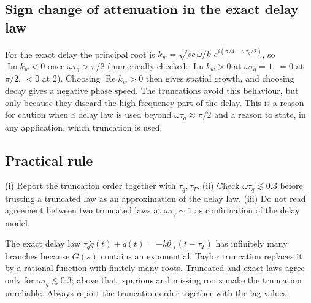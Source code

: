 \subsection{Sign change of attenuation in the exact delay law}
For the exact delay the principal root is $k_w=\sqrt{\rho c\,\omega/k}\;e^{i(\pi/4-\omega\tau_q/2)}$, so $\operatorname{Im}k_w<0$ once $\omega\tau_q>\pi/2$ (numerically checked: $\operatorname{Im}k_w>0$ at $\omega\tau_q=1$, $=0$ at $\pi/2$, $<0$ at $2$). Choosing $\operatorname{Re}k_w>0$ then gives spatial growth, and choosing decay gives a negative phase speed. The truncations avoid this behaviour, but only because they discard the high-frequency part of the delay. This is a reason for caution when a delay law is used beyond $\omega\tau_q\approx\pi/2$ and a reason to state, in any application, which truncation is used.

\subsection{Practical rule}
(i) Report the truncation order together with $\tau_q,\tau_T$. (ii) Check $\omega\tau_q\lesssim0.3$ before trusting a truncated law as an approximation of the delay law. (iii) Do not read agreement between two truncated laws at $\omega\tau_q\sim1$ as confirmation of the delay model.


\begin{summarybox}[Summary]
The exact delay law $\tau_q\dot q(t)+q(t)=-k\theta_{,i}(t-\tau_T)$ has infinitely many branches because $G(s)$ contains an exponential. Taylor truncation replaces it by a rational function with finitely many roots. Truncated and exact laws agree only for $\omega\tau_q\lesssim0.3$; above that, spurious and missing roots make the truncation unreliable. Always report the truncation order together with the lag values.
\end{summarybox}